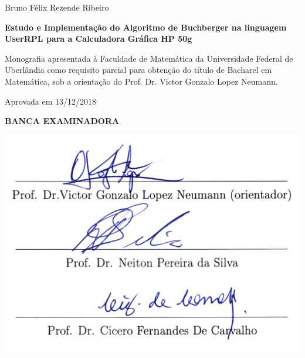 \documentclass[12pt,a4paper]{report}
\newcommand{\SignatureLine}{
  \underline{\ \ \ \ \ \ \ \ \ \ \ \ \ \ \ \ \ \ \ \ \ \ \ \ \ \ \ \
    \ \ \ \ \ \ \ \ \ \ \ \ \ \ \ \ \ \ \ \ \ \ \ \ \ \ \ \ \ \ \ \ \
    \ \ \ \ \ \ \ \ \ \ \ \ \ \ \ \ \ \ \ \ }\\
}
\numberwithin{theorem}{chapter}
\newcommand{\WorkTitle}{Estudo e Implementação do Algoritmo de
  Buchberger na linguagem UserRPL para a Calculadora Gráfica HP 50g}
\newcommand{\WorkDescription}{Monografia apresentada à Faculdade de
  Matemática da Universidade Federal de Uberlândia como requisito
  parcial para obtenção do título de Bacharel em Matemática, sob a
  orientação do Prof. Dr. Victor Gonzalo Lopez Neumann.}
\newcommand{\WorkAuthor}{Bruno Félix Rezende Ribeiro}
\begin{document}


\newpage

\begin{center}
  {\LARGE\WorkAuthor}
\end{center}

\vspace{1cm}

\begin{center}
  {\LARGE\textbf{\WorkTitle}}
\end{center}

\vspace{\fill}

\begin{adjustwidth}{7cm}{0cm}
  {\large\WorkDescription}
\end{adjustwidth}

\vspace{\fill}

\begin{center}
  {\large Aprovada em 13/12/2018}

  \vspace{\fill}

  {\large\textbf{BANCA EXAMINADORA}}

  \vspace{2em}\centerline{\includegraphics[scale=1]{sig}}\vspace{2em}







\end{center}
\end{document}

